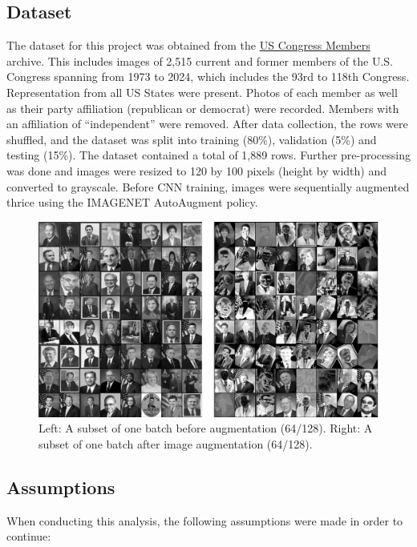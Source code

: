 \documentclass[manuscript,screen,review]{acmart}
\begin{document}
\subsection{Dataset}

The dataset for this project was obtained from the \href{https://www.congress.gov/members}{US Congress Members} archive. This includes images of 2,515 current and former members of the U.S. Congress spanning from 1973 to 2024, which includes the 93rd to 118th Congress. Representation from all US States were present. Photos of each member as well as their party affiliation (republican or democrat) were recorded. Members with an affiliation of ``independent'' were removed. After data collection, the rows were shuffled, and the dataset was split into training (80\%), validation (5\%) and testing (15\%). The dataset contained a total of 1,889 rows. Further pre-processing was done and images were resized to 120 by 100 pixels (height by width) and converted to grayscale. Before CNN training, images were sequentially augmented thrice using the IMAGENET AutoAugment policy. 

\begin{figure}[h]
  \centering
  \includegraphics[width=\linewidth]{../presentation/batch_both.png}
  \caption{Left: A subset of one batch before augmentation (64/128). Right: A subset of one batch after image augmentation (64/128).}
  \label{fig:batch}
\end{figure}

\subsection{Assumptions}

When conducting this analysis, the following assumptions were made in order to continue:
\end{document}
